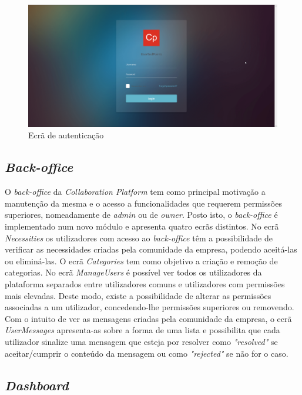 \begin{figure}[H]
  \centering 
  \includegraphics[scale=0.35]{figures/LoginScreen.png}
  \caption{Ecrã de autenticação}\label{fig:LoginScreen}
\end{figure}

\subsection{\textit{Back-office}}\label{subsec:implementacao:back-office}

O \textit{back-office} da \textit{Collaboration Platform} tem como principal motivação a manutenção da mesma e o acesso a funcionalidades que requerem permissões superiores, nomeadamente de \textit{admin} ou de \textit{owner}.
Posto isto, o \textit{back-office} é implementado num novo módulo e apresenta quatro ecrãs distintos. 
No ecrã \textit{Necessities} os utilizadores com acesso ao \textit{back-office} têm a possibilidade de verificar as necessidades criadas pela comunidade da empresa, podendo aceitá-las ou eliminá-las. 
O ecrã \textit{Categories} tem como objetivo a criação e remoção de categorias. 
No ecrã \textit{ManageUsers} é possível ver todos os utilizadores da plataforma separados entre utilizadores comuns e utilizadores com permissões mais elevadas.
Deste modo, existe a possibilidade de alterar as permissões associadas a um utilizador, concedendo-lhe permissões superiores ou removendo. 
Com o intuito de ver as mensagens criadas pela comunidade da empresa, o ecrã \textit{UserMessages} apresenta-as sobre a forma de uma lista e possibilita que cada utilizador sinalize uma mensagem que esteja por resolver como \textit{"resolved"} se aceitar/cumprir o conteúdo da mensagem ou como \textit{"rejected"} se não for o caso.  



\subsection{\textit{Dashboard}}\label{subsec:implementacao:dashboard}

